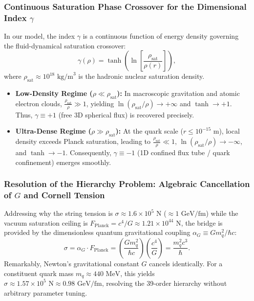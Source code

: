 \subsubsection{Continuous Saturation Phase Crossover for the Dimensional Index \texorpdfstring{$\gamma$}{gamma}}
\label{sec:surekli_gamma}
In our model, the index $\gamma$ is a continuous function of energy density governing the fluid-dynamical saturation crossover:
\begin{equation}
    \gamma(\rho) = \tanh\left( \ln\left[ \frac{\rho_{\mathrm{sat}}}{\rho(r)} \right] \right),
    \label{eq:gamma_surekli_gecis}
\end{equation}
where $\rho_{\mathrm{sat}} \approx 10^{18}\text{ kg/m}^3$ is the hadronic nuclear saturation density.
\begin{itemize}
    \item \textbf{Low-Density Regime ($\rho \ll \rho_{\mathrm{sat}}$):} In macroscopic gravitation and atomic electron clouds, $\frac{\rho_{\mathrm{sat}}}{\rho} \gg 1$, yielding $\ln(\rho_{\mathrm{sat}}/\rho) \to +\infty$ and $\tanh \to +1$. Thus, $\gamma \equiv +1$ (free 3D spherical flux) is recovered precisely.
    \item \textbf{Ultra-Dense Regime ($\rho \gg \rho_{\mathrm{sat}}$):} At the quark scale ($r \le 10^{-15}\text{ m}$), local density exceeds Planck saturation, leading to $\frac{\rho_{\mathrm{sat}}}{\rho} \ll 1$, $\ln(\rho_{\mathrm{sat}}/\rho) \to -\infty$, and $\tanh \to -1$. Consequently, $\gamma \equiv -1$ (1D confined flux tube / quark confinement) emerges smoothly.
\end{itemize}

\subsubsection{Resolution of the Hierarchy Problem: Algebraic Cancellation of $G$ and Cornell Tension}
\label{sec:hiyerarsi_monograph_en}
Addressing why the string tension is $\sigma \approx 1.6 \times 10^5\text{ N}$ ($\approx 1\text{ GeV/fm}$) while the vacuum saturation ceiling is $F_{\mathrm{Planck}} = c^4/G \approx 1.21 \times 10^{44}\text{ N}$, the bridge is provided by the dimensionless quantum gravitational coupling $\alpha_G \equiv G m_q^2 / \hbar c$:
\begin{equation}
    \sigma = \alpha_G \cdot F_{\mathrm{Planck}} = \left( \frac{G m_q^2}{\hbar c} \right) \left( \frac{c^4}{G} \right) = \frac{m_q^2 c^3}{\hbar}.
    \label{eq:sigma_monograph_ispat_en}
\end{equation}
Remarkably, Newton's gravitational constant $G$ cancels identically. For a constituent quark mass $m_q \approx 440\text{ MeV}$, this yields $\sigma \approx 1.57 \times 10^5\text{ N} \approx 0.98\text{ GeV/fm}$, resolving the 39-order hierarchy without arbitrary parameter tuning.

